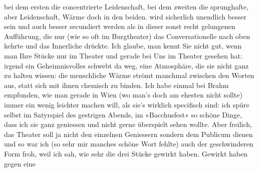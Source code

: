               bei dem ersten die
               concentrierte Leidenschaft, bei dem zweiten die sprunghafte, aber Leidenschaft, Wärme doch in den beiden. \label{K_L03655-3v}\label{K_L03655-3} wird
               sicherlich unendlich besser sein und auch besser secundiert werden als in dieser
               sonst recht gelungenen Aufführung, die nur (wie so oft im Burgtheater) das Conversationelle nach oben kehrte und das
               Innerliche drückte. Ich glaube, man kennt Sie nicht gut, wenn man Ihre Stücke nur im
               Theater und gerade bei Uns im Theater gesehen hat: irgend ein \strikeout{\textcolor{gray}{Fond}} Geheimnisvolles schwebt da weg,
               eine Atmosphäre, die sie nicht ganz zu {\pb}halten wissen: die menschliche Wärme strömt manchmal zwischen den Worten aus, statt
               sich mit ihnen chemisch zu binden. Ich habe einmal bei Brahm empfunden, wie man gerade in Wien (wo man’s doch am ehesten \introOben{}nicht\introOben{}
               sollte) immer ein wenig leichter machen will, als sie's wirklich specifisch sind: ich
               spüre selbst im Satyrspiel des gestrigen Abends, im »Bacchusfest« so schöne Dinge, dass ich sie ganz geniessen und nicht gerne
               überspielt sehen wollte. Aber freilich, das Theater soll ja nicht den einzelnen
               Geniessern sondern dem Publicum dienen und so war ich (so sehr mir manches schöne
               Wort fehlte) auch der geschwinderen Form froh, weil ich sah, wie sehr die drei Stücke gewirkt haben. Gewirkt haben gegen eine
